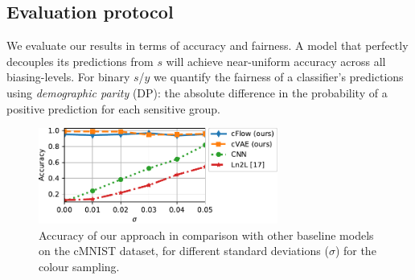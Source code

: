 \subsection{Evaluation protocol}
%
We evaluate our results in terms of accuracy and fairness. A model that perfectly decouples its
predictions from $s$ will achieve near-uniform accuracy across all biasing-levels. 
%
For binary $s$/$y$ we quantify the fairness of a classifier's predictions using \emph{demographic
parity} (DP): the  absolute difference in the probability  of a positive prediction for each
sensitive group.

\begin{figure}[tb]
    \centering
    \includegraphics[width=0.7\textwidth]{nifr/Figures/cmnist_new_no_hgr.pdf}
    \caption{
        Accuracy of our approach in comparison with other baseline models on the cMNIST dataset,
        for different standard deviations ($\sigma$) for the colour sampling.
    }%
    \label{fig:cmnist_chart}
\end{figure}

